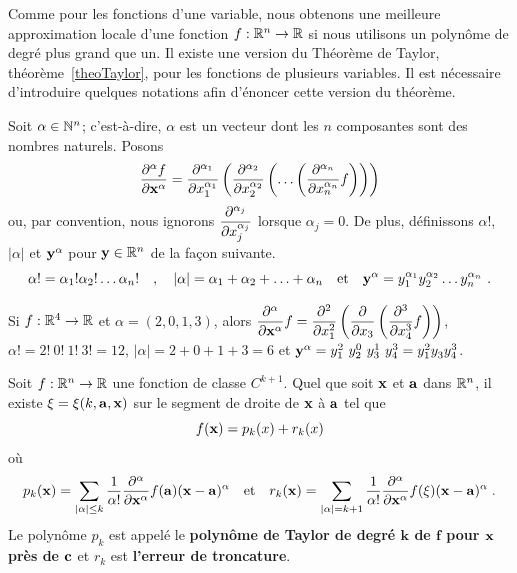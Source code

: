{Comme pour les fonctions d'une variable, nous obtenons une meilleure
approximation locale d'une fonction $f:\RR^n \to \RR$ si nous utilisons un
polynôme de degré plus grand que un.   Il existe une version du Théorème de
Taylor, théorème~\ref{theoTaylor}, pour les fonctions de plusieurs
variables.  Il est nécessaire d'introduire quelques notations afin
d'énoncer cette version du théorème.

Soit $\alpha \in \NN^n$; c'est-à-dire, $\alpha$ est un vecteur dont
les $n$ composantes sont des nombres naturels.   Posons
\[
  \pdydxn{f}{\VEC{x}}{\alpha} = \pdfdxn{}{x_1}{\alpha_1} \left(
  \pdfdxn{}{x_2}{\alpha_2} \left( \ldots \left(
  \pdfdxn{f}{x_n}{\alpha_n}\right)\right)\right)
\]
ou, par convention, nous ignorons
$\DS \pdfdxn{}{x_j}{\alpha_j}$ lorsque $\alpha_j = 0$.
De plus, définissons $\alpha!$, $|\alpha|$ et $\VEC{y}^{\alpha}$ pour
$\VEC{y}\in \RR^n$ de la façon suivante.
\[
\alpha! = \alpha_1! \alpha_2! \ldots \alpha_n! \quad , \quad
|\alpha| = \alpha_1 + \alpha_2 + \ldots + \alpha_n \quad
\text{et} \quad
\VEC{y}^{\alpha} = y_1^{\alpha_1} y_2^{\alpha_2}\ldots y_n^{\alpha_n} \ .
\]

\begin{egg}
Si $f:\RR^4 \to \RR$ et $\alpha = (2,0,1,3)$, alors
$\DS \pdfdxn{f}{\VEC{x}}{\alpha} = \pdfdxn{}{x_1}{2} \left(
\pdfdx{}{x_3} \left( \pdfdxn{f}{x_4}{3}\right)\right)$,
$\alpha! = 2!\ 0!\ 1!\ 3!= 12$, $|\alpha| = 2 + 0 + 1 + 3 = 6$ et
$\VEC{y}^{\alpha} = y_1^2\ y_2^0\ y_3^1\ y_4^3 = y_1^2 y_3^{} y_4^3$.
\end{egg}

\begin{theorem} 
Soit $f:\RR^n\to \RR$ une fonction de classe $C^{k+1}$.  Quel que soit
$\VEC{x}$ et $\VEC{a}$ dans $\RR^n$, il existe $\xi = \xi(k,\VEC{a},\VEC{x})$
sur le segment de droite de $\VEC{x}$ à $\VEC{a}$ tel que
\[
f(\VEC{x}) = p_k(x) + r_k(x)
\]
où
\[
p_k(\VEC{x}) = \sum_{|\alpha|\leq k} \frac{1}{\alpha !}
  \pdfdxn{f}{\VEC{x}}{\alpha}(\VEC{a}) (\VEC{x}- \VEC{a})^{\alpha} 
\quad \text{et} \quad
r_k(\VEC{x}) = \sum_{|\alpha|=k+1} \frac{1}{\alpha !}
  \pdfdxn{f}{\VEC{x}}{\alpha}(\xi) (\VEC{x}- \VEC{a})^{\alpha} \; .
\]
Le polynôme $p_k$ est appelé le {\bfseries polynôme de Taylor de degré
$\mathbf{k}$ de $\mathbf{f}$ pour $\VEC{x}$ près de
$\VEC{c}$} et $r_k$
est {\bfseries l'erreur de troncature}.
\label{theoTaylorNdim}
\end{theorem}

}

